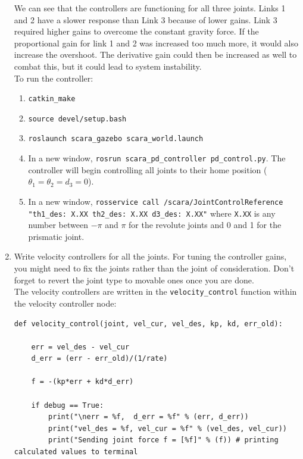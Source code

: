 \documentclass[10pt]{article}
\begin{document}
\begin{enumerate}
	We can see that the controllers are functioning for all three joints. Links 1 and 2 have a slower response than Link 3 because of lower gains. Link 3 required higher gains to overcome the constant gravity force. If the proportional gain for link 1 and 2 was increased too much more, it would also increase the overshoot. The derivative gain could then be increased as well to combat this, but it could lead to system instability.
	\\

	To run the controller:
	
	\begin{enumerate}
		\item \texttt{catkin\_make}
		\item \texttt{source devel/setup.bash}
		\item \texttt{roslaunch scara\_gazebo scara\_world.launch}
		\item In a new window, \texttt{rosrun scara\_pd\_controller pd\_control.py}. The controller will begin controlling all joints to their home position ($\theta_1 = \theta_2 = d_3 = 0$).
		\item In a new window, \texttt{rosservice call /scara/JointControlReference "th1\_des: X.XX th2\_des: X.XX d3\_des: X.XX"} where \texttt{X.XX} is any number between $-\pi$ and $\pi$ for the revolute joints and 0 and 1 for the prismatic joint.
	\end{enumerate}
	
	\item Write velocity controllers for all the joints. For tuning the controller gains, you might need to fix the joints rather than the joint of consideration. Don't forget to revert the joint type to movable ones once you are done.
	\\
	
	The velocity controllers are written in the \texttt{velocity\_control} function within the velocity controller node:

\begin{lstlisting}[style=Matlab-editor,basicstyle=\mlttfamily,escapechar=`]
def velocity_control(joint, vel_cur, vel_des, kp, kd, err_old):
	
	err = vel_des - vel_cur
	d_err = (err - err_old)/(1/rate)
	
	f = -(kp*err + kd*d_err)
	
	if debug == True:
		print("\nerr = %f,  d_err = %f" % (err, d_err))
		print("vel_des = %f, vel_cur = %f" % (vel_des, vel_cur))
		print("Sending joint force f = [%f]" % (f)) # printing calculated values to terminal
	

\end{lstlisting}
\end{enumerate}
\end{document}
